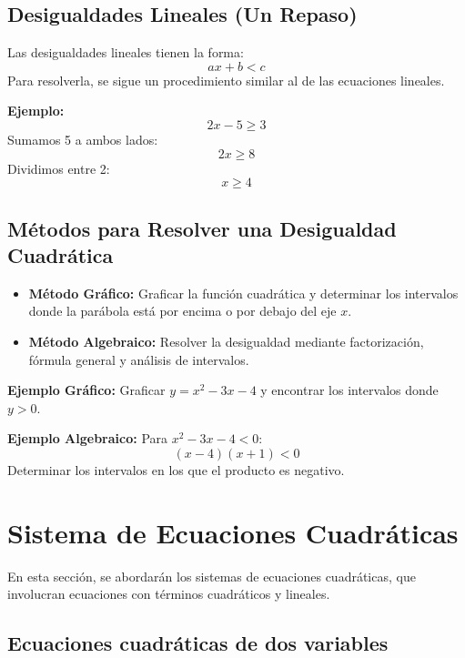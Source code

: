     \subsection{Desigualdades Lineales (Un Repaso)}
    
    Las desigualdades lineales tienen la forma:
    \[
    ax + b < c
    \]
    Para resolverla, se sigue un procedimiento similar al de las ecuaciones lineales. 
    
    \textbf{Ejemplo:}
    \[
    2x - 5 \geq 3
    \]
    Sumamos 5 a ambos lados:
    \[
    2x \geq 8
    \]
    Dividimos entre 2:
    \[
    x \geq 4
    \]
    
    \subsection{Métodos para Resolver una Desigualdad Cuadrática}
    
    \begin{itemize}
        \item \textbf{Método Gráfico:} Graficar la función cuadrática y determinar los intervalos donde la parábola está por encima o por debajo del eje \(x\).
        
        \item \textbf{Método Algebraico:} Resolver la desigualdad mediante factorización, fórmula general y análisis de intervalos.
    \end{itemize}
    
    \textbf{Ejemplo Gráfico:} Graficar \(y = x^2 - 3x - 4\) y encontrar los intervalos donde \(y > 0\).
    
    \textbf{Ejemplo Algebraico:} Para \(x^2 - 3x - 4 < 0\):
    \[
    (x - 4)(x + 1) < 0
    \]
    Determinar los intervalos en los que el producto es negativo.
    
    







    \section{Sistema de Ecuaciones Cuadráticas} %

    En esta sección, se abordarán los sistemas de ecuaciones cuadráticas, que involucran ecuaciones con términos cuadráticos y lineales. 
    
    \subsection{Ecuaciones cuadráticas de dos variables}
    
